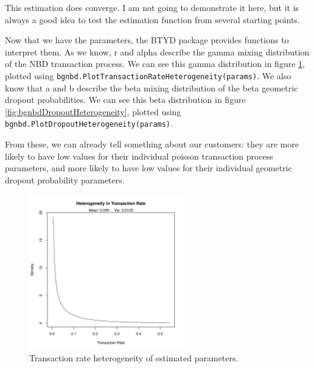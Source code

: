 \documentclass[10pt, letterpaper, onecolumn, oneside, final]{article}\usepackage[]{graphicx}\usepackage[]{color}
\begin{document}
This estimation does converge. I am not going to demonstrate it here,
but it is always a good idea to test the estimation function
from several starting points.

Now that we have the parameters, the BTYD package provides functions
to interpret them. As we know, r and alpha describe the gamma mixing
distribution of the NBD transaction process. We can see this gamma
distribution in figure \ref{fig:bgnbdTransactionHeterogeneity}, plotted
using \texttt{bgnbd.PlotTransactionRateHeterogeneity(params)}. We also
know that a and b describe the beta mixing distribution of the
beta geometric dropout probabilities. We can see this beta
distribution in figure \ref{fig:bgnbdDropoutHeterogeneity}, plotted
using \texttt{bgnbd.PlotDropoutHeterogeneity(params)}.

From these, we can already tell something about our customers: they
are more likely to have low values for their individual poisson
transaction process parameters, and more likely to have low values for
their individual geometric dropout probability parameters.



\begin{figure}
  \begin{center}
  \includegraphics[width=0.6\textwidth]{figure/bgnbdTransactionHeterogeneity}
  \caption{Transaction rate heterogeneity of estimated parameters.}\label{fig:bgnbdTransactionHeterogeneity}
  \end{center}
\end{figure}
      
\end{document}
